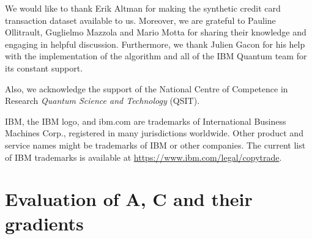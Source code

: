 \documentclass[twocolumn, aps, pra, superscriptaddress, floatfix]{revtex4}
\begin{document}
We would like to thank Erik Altman for making the synthetic credit card transaction dataset available to us. 
Moreover, we are grateful to Pauline Ollitrault, Guglielmo Mazzola and Mario Motta for sharing their knowledge and engaging in helpful discussion.
Furthermore, we thank Julien Gacon for his help with the implementation of the algorithm and all of the IBM Quantum team for its constant support.

Also, we acknowledge the support of the National Centre of Competence in Research \textit{Quantum Science and Technology} (QSIT).

IBM, the IBM logo, and ibm.com are trademarks of International Business Machines Corp., registered in many jurisdictions worldwide. Other product and service names might be trademarks of IBM or other companies. The current list of IBM trademarks is available at \url{https://www.ibm.com/legal/copytrade}.


%
%


\appendix




\section{Evaluation of A, C and their gradients}
\label{app:a_c}
\end{document}

